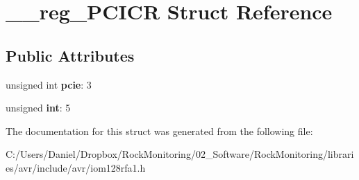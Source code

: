 \hypertarget{struct____reg___p_c_i_c_r}{}\section{\+\_\+\+\_\+reg\+\_\+\+P\+C\+I\+CR Struct Reference}
\label{struct____reg___p_c_i_c_r}
\subsection*{Public Attributes}
\begin{DoxyCompactItemize}
\item 
unsigned int {\bfseries pcie}\+: 3\hypertarget{struct____reg___p_c_i_c_r_a6f8168322eea7859c43d2856bee25436}{}\label{struct____reg___p_c_i_c_r_a6f8168322eea7859c43d2856bee25436}

\item 
unsigned {\bfseries int}\+: 5\hypertarget{struct____reg___p_c_i_c_r_a1ce2b9b4b566bd5c99ece3d55c073b06}{}\label{struct____reg___p_c_i_c_r_a1ce2b9b4b566bd5c99ece3d55c073b06}

\end{DoxyCompactItemize}


The documentation for this struct was generated from the following file\+:\begin{DoxyCompactItemize}
\item 
C\+:/\+Users/\+Daniel/\+Dropbox/\+Rock\+Monitoring/02\+\_\+\+Software/\+Rock\+Monitoring/libraries/avr/include/avr/iom128rfa1.\+h\end{DoxyCompactItemize}
